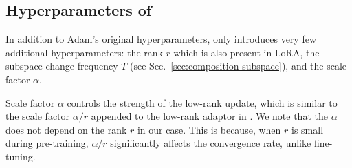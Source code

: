 \subsection{Hyperparameters of \lowrank{}}
\label{sec:lowrank-hyperparams}
In addition to Adam's original hyperparameters, \lowrank{} only introduces very few additional hyperparameters: the rank $r$ which is also present in LoRA, the subspace change frequency $T$ (see Sec.~\ref{sec:composition-subspace}), and the scale factor $\alpha$.

Scale factor $\alpha$ controls the strength of the low-rank update, which is similar to the scale factor $\alpha/r$ appended to the low-rank adaptor in \citet{huLoRALowRankAdaptation2021}.
We note that the $\alpha$ does not depend on the rank $r$ in our case.
This is because, when $r$ is small during pre-training, $\alpha/r$ significantly affects the convergence rate, unlike fine-tuning.


